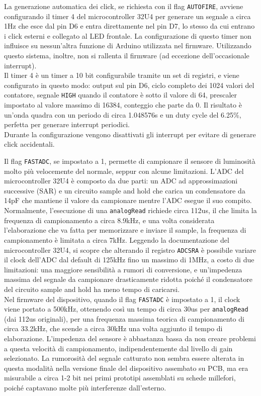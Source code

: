 La generazione automatica dei click, se richiesta con il flag \texttt{AUTOFIRE}, avviene configurando il timer 4 del microcontroller 32U4 per generare un segnale a circa 1Hz che esce dal pin D6 e entra direttamente nel pin D7, lo stesso da cui entrano i click esterni e collegato al LED frontale. La configurazione di questo timer non influisce su nessun'altra funzione di Arduino utilizzata nel firmware. Utilizzando questo sistema, inoltre, non si rallenta il firmware (ad eccezione dell'occasionale interrupt).\\
Il timer 4 è un timer a 10 bit configurabile tramite un set di registri\cite{atmega32u4_datasheet}, e viene configurato in questo modo: output sul pin D6, ciclo completo dei 1024 valori del contatore, segnale \texttt{HIGH} quando il contatore è sotto il valore di 64, prescaler impostato al valore massimo di 16384, conteggio che parte da 0. Il risultato è un'onda quadra con un periodo di circa 1.048576s e un duty cycle del 6.25\%, perfetta per generare interrupt periodici.\\
Durante la configurazione vengono disattivati gli interrupt per evitare di generare click accidentali.

Il flag \texttt{FASTADC}, se impostato a 1, permette di campionare il sensore di luminosità molto più velocemente del normale, seppur con alcune limitazioni. L'ADC del microcontroller 32U4 è composto da due parti: un ADC ad approssimazioni successive (SAR) e un circuito sample and hold che carica un condensatore da 14pF che mantiene il valore da campionare mentre l'ADC esegue il suo compito.\\
Normalmente, l'esecuzione di una \texttt{analogRead} richiede circa 112us, il che limita la frequenza di campionamento a circa 8.9kHz, e una volta considerata l'elaborazione che va fatta per memorizzare e inviare il sample, la frequenza di campionamento è limitata a circa 7kHz. Leggendo la documentazione del microcontroller 32U4, si scopre che alterando il registro \texttt{ADCSRA} è possibile variare il clock dell'ADC dal default di 125kHz fino un massimo di 1MHz\cite{atmega32u4_datasheet}, a costo di due limitazioni: una maggiore sensibilità a rumori di conversione, e un'impedenza massima del segnale da campionare drasticamente ridotta poiché il condensatore del circuito sample and hold ha meno tempo di caricarsi.\\
Nel firmware del dispositivo, quando il flag \texttt{FASTADC} è impostato a 1, il clock viene portato a 500kHz, ottenendo così un tempo di circa 30us per \texttt{analogRead} (dai 112us originali), per una frequenza massima teorica di campionamento di circa 33.2kHz, che scende a circa 30kHz una volta aggiunto il tempo di elaborazione. L'impedenza del sensore è abbastanza bassa da non creare problemi a questa velocità di campionamento, indipendentemente dal livello di gain selezionato. La rumorosità del segnale catturato non sembra essere alterata in questa modalità nella versione finale del dispositivo assembato su PCB, ma era misurabile a circa 1-2 bit nei primi prototipi assemblati su schede millefori, poiché captavano molte più interferenze dall'esterno.

